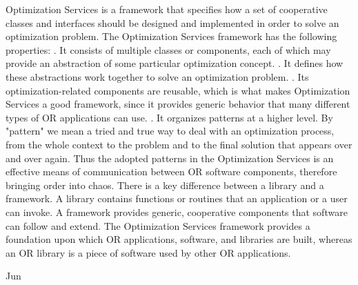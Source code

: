 \documentclass[11pt]{amsart}
\begin{document}
Optimization Services is a framework that specifies how a set of cooperative classes and interfaces
should be designed and implemented in order to solve an optimization problem. The Optimization Services
framework has the following properties:
. It consists of multiple classes or components, each of which may provide an abstraction of some
particular optimization concept.
. It defines how these abstractions work together to solve an optimization problem.
. Its optimization-related components are reusable, which is what makes Optimization Services a good
framework, since it provides generic behavior that many different types of OR applications can use.
. It organizes patterns at a higher level. By "pattern" we mean a tried and true way to deal with an
optimization process, from the whole context to the problem and to the final solution that appears over
and over again. Thus the adopted patterns in the Optimization Services is an effective means of
communication between OR software components, therefore bringing order into chaos.
There is a key difference between a library and a framework. A library contains functions or routines
that an application or a user can invoke. A framework provides generic, cooperative components that
software can follow and extend. The Optimization Services framework provides a foundation upon which OR applications, software, and libraries
are built, whereas an OR library is a piece of software used by other OR applications.



Jun



\end{document}
